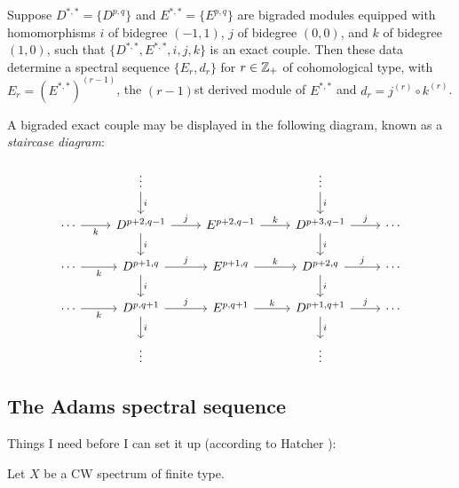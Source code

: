 \documentclass{MetricNotes2023}
\def\inte{\ensuremath\mathbb{Z}}
\begin{document}
\begin{theorem}
Suppose \(D^{*,*}=\{D^{p,q}\}\) and \(E^{*,*}=\{E^{p,q}\}\) are bigraded modules equipped with homomorphisms \(i\) of bidegree \((-1,1)\), \(j\) of bidegree \((0,0)\), and \(k\) of bidegree \((1,0)\), such that \(\{D^{*,*}, E^{*,*}, i, j, k\}\) is an exact couple. Then these data determine a spectral sequence \(\{E_r, d_r\}\) for \(r\in \inte_+\) of cohomological type, with \(E_r=(E^{*,*})^{(r-1)}\), the \((r-1)\)st derived module of \(E^{*,*}\) and \(d_r=j^{(r)}\circ k^{(r)}\). 
\end{theorem}

A bigraded exact couple may be displayed in the following diagram, known as a \textit{staircase diagram}:

\[\begin{tikzcd} 
   &  \vdots \arrow[d, "i"] &  & \vdots \arrow[d, "i"] & \\
 \cdots \arrow[r, swap, "k"] & D^{p+2, q-1} \arrow[d, "i"] \arrow[r, "j"] & E^{p+2,q-1}  \arrow[r, "k"] & D^{p+3,q-1} \arrow[d, "i"] \arrow[r, "j"] & \cdots \\
 \cdots \arrow[r, swap, "k"] & D^{p+1,q} \arrow[d, "i"] \arrow[r, "j"] & E^{p+1,q}  \arrow[r, "k"] & D^{p+2,q} \arrow[d, "i"] \arrow[r, "j"] & \cdots \\
 \cdots \arrow[r, swap, "k"] & D^{p,q+1}  \arrow[d, "i"] \arrow[r, "j"] & E^{p,q+1}  \arrow[r, "k"] & D^{p+1,q+1} \arrow[d, "i"] \arrow[r, "j"] & \cdots \\
 & \vdots &  & \vdots & 
\end{tikzcd}\]


\subsection{The Adams spectral sequence}

Things I need before I can set it up (according to Hatcher \autocite{hatcher5}):

Let \(X\) be a CW spectrum of finite type.
\end{document}
